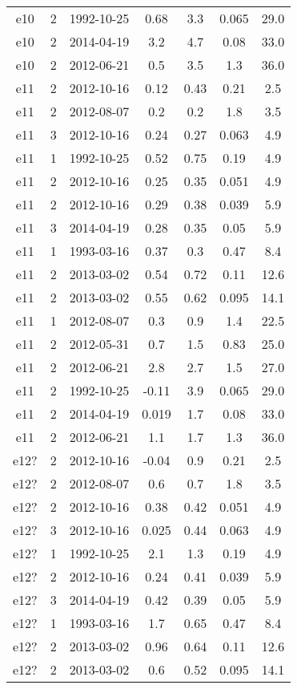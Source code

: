 \begin{table*}[htp]
\begin{tabular}{ccccccc}
e10 & 2 & 1992-10-25 & 0.68 & 3.3 & 0.065 & 29.0 \\
e10 & 2 & 2014-04-19 & 3.2 & 4.7 & 0.08 & 33.0 \\
e10 & 2 & 2012-06-21 & 0.5 & 3.5 & 1.3 & 36.0 \\
e11 & 2 & 2012-10-16 & 0.12 & 0.43 & 0.21 & 2.5 \\
e11 & 2 & 2012-08-07 & 0.2 & 0.2 & 1.8 & 3.5 \\
e11 & 3 & 2012-10-16 & 0.24 & 0.27 & 0.063 & 4.9 \\
e11 & 1 & 1992-10-25 & 0.52 & 0.75 & 0.19 & 4.9 \\
e11 & 2 & 2012-10-16 & 0.25 & 0.35 & 0.051 & 4.9 \\
e11 & 2 & 2012-10-16 & 0.29 & 0.38 & 0.039 & 5.9 \\
e11 & 3 & 2014-04-19 & 0.28 & 0.35 & 0.05 & 5.9 \\
e11 & 1 & 1993-03-16 & 0.37 & 0.3 & 0.47 & 8.4 \\
e11 & 2 & 2013-03-02 & 0.54 & 0.72 & 0.11 & 12.6 \\
e11 & 2 & 2013-03-02 & 0.55 & 0.62 & 0.095 & 14.1 \\
e11 & 1 & 2012-08-07 & 0.3 & 0.9 & 1.4 & 22.5 \\
e11 & 2 & 2012-05-31 & 0.7 & 1.5 & 0.83 & 25.0 \\
e11 & 2 & 2012-06-21 & 2.8 & 2.7 & 1.5 & 27.0 \\
e11 & 2 & 1992-10-25 & -0.11 & 3.9 & 0.065 & 29.0 \\
e11 & 2 & 2014-04-19 & 0.019 & 1.7 & 0.08 & 33.0 \\
e11 & 2 & 2012-06-21 & 1.1 & 1.7 & 1.3 & 36.0 \\
e12? & 2 & 2012-10-16 & -0.04 & 0.9 & 0.21 & 2.5 \\
e12? & 2 & 2012-08-07 & 0.6 & 0.7 & 1.8 & 3.5 \\
e12? & 2 & 2012-10-16 & 0.38 & 0.42 & 0.051 & 4.9 \\
e12? & 3 & 2012-10-16 & 0.025 & 0.44 & 0.063 & 4.9 \\
e12? & 1 & 1992-10-25 & 2.1 & 1.3 & 0.19 & 4.9 \\
e12? & 2 & 2012-10-16 & 0.24 & 0.41 & 0.039 & 5.9 \\
e12? & 3 & 2014-04-19 & 0.42 & 0.39 & 0.05 & 5.9 \\
e12? & 1 & 1993-03-16 & 1.7 & 0.65 & 0.47 & 8.4 \\
e12? & 2 & 2013-03-02 & 0.96 & 0.64 & 0.11 & 12.6 \\
e12? & 2 & 2013-03-02 & 0.6 & 0.52 & 0.095 & 14.1 \\

\end{tabular}
\end{table*}
